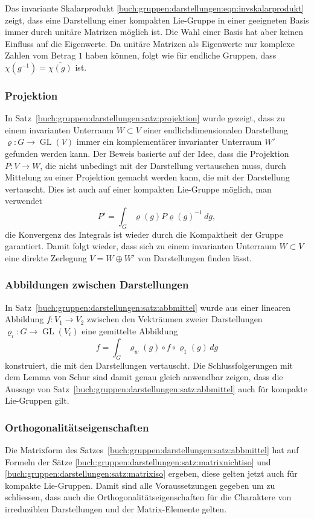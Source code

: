 Das invariante Skalarprodukt
\eqref{buch:gruppen:darstellungen:eqn:invskalarprodukt}
zeigt, dass eine Darstellung einer kompakten Lie-Gruppe in einer
geeigneten Basis immer durch unitäre Matrizen möglich ist.
Die Wahl einer Basis hat aber keinen Einfluss auf die Eigenwerte.
Da unitäre Matrizen als Eigenwerte nur komplexe Zahlen vom Betrag $1$
haben können, folgt wie für endliche Gruppen, dass
$\chi(g^{-1})=\overline{\chi(g)}$ ist.

%
%
\subsubsection{Projektion}
In Satz~\ref{buch:gruppen:darstellungen:satz:projektion} wurde gezeigt,
dass zu einem invarianten Unterraum $W\subset V$ einer endlichdimensionalen
Darstellung $\varrho\colon G\to \operatorname{GL}(V)$ immer ein komplementärer
invarianter Unterraum $W'$ gefunden werden kann.
Der Beweis basierte auf der Idee, dass die Projektion $P\colon V\to W$,
die nicht unbedingt mit der Darstellung vertauschen muss, durch Mittelung
zu einer Projektion gemacht werden kann, die mit der Darstellung vertauscht.
Dies ist auch auf einer kompakten Lie-Gruppe möglich, man verwendet
\[
P'
=
\int_G \varrho(g)P\varrho(g)^{-1}\,dg,
\]
die Konvergenz des Integrals ist wieder durch die Kompaktheit der Gruppe
garantiert.
Damit folgt wieder, dass sich zu einem invarianten Unterraum $W\subset V$
eine direkte Zerlegung $V=W\oplus W'$ von Darstellungen finden lässt.

%
%
\subsubsection{Abbildungen zwischen Darstellungen}
In Satz~\ref{buch:gruppen:darstellungen:satz:abbmittel} wurde aus einer
linearen Abbildung $f\colon V_1\to V_2$ zwischen den Vekträumen zweier
Darstellungen $\varrho_i\colon G\to\operatorname{GL}(V_i)$ eine
gemittelte Abbildung 
\[
f
=
\int_G \varrho_w(g) \circ f \circ \varrho_1(g)\,dg
\]
konstruiert, die mit den Darstellungen vertauscht.
Die Schlussfolgerungen mit dem Lemma von Schur sind damit genau gleich
anwendbar zeigen, dass die Aussage von
Satz~\ref{buch:gruppen:darstellungen:satz:abbmittel} auch für kompakte
Lie-Gruppen gilt.

%
%
\subsubsection{Orthogonalitätseigenschaften}
Die Matrixform des Satzes~\ref{buch:gruppen:darstellungen:satz:abbmittel} 
hat auf Formeln der Sätze 
\ref{buch:gruppen:darstellungen:satz:matrixnichtiso}
und
\ref{buch:gruppen:darstellungen:satz:matrixiso}
ergeben, diese gelten jetzt auch für kompakte Lie-Gruppen.
Damit sind alle Voraussetzungen gegeben um zu schliessen, dass auch
die Orthogonalitätseigenschaften für die Charaktere von irreduziblen
Darstellungen und der Matrix-Elemente gelten.

